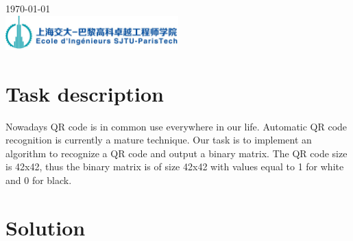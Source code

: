 \documentclass[10pt]{article}
\begin{document}
\begin{titlepage}


{\large \today}\\[2cm] %


\includegraphics[width=0.5\textwidth]{logo_SPEIT.jpg}\\[1cm] %


\vfill %

\end{titlepage}
\indent
\section{Task description}

Nowadays QR code is in common use everywhere in our life. Automatic QR code recognition is currently a 
mature technique. Our task is to implement an algorithm to recognize a QR code and output a
binary matrix. The QR code size is 42x42, thus the binary matrix is of size 42x42 with values
 equal to 1 for white and 0 for black. 

\section{Solution}
\end{document}
